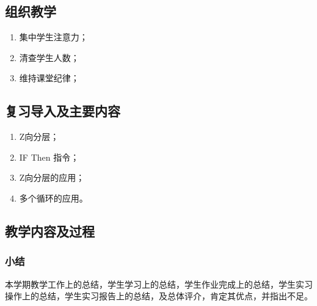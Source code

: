 \jxhj{%
	}

\makeshouye %

\subsection{组织教学}
\begin{enumerate}[\hspace{2em}1、]
	\item 集中学生注意力；
	\item 清查学生人数；
	\item 维持课堂纪律；
\end{enumerate}

\subsection{复习导入及主要内容}
\begin{enumerate}[1、]
\item Z向分层；
\item IF Then 指令；
\item Z向分层的应用；
\item 多个循环的应用。
\end{enumerate}

\subsection{教学内容及过程}
	
\subsubsection{小结}
	本学期教学工作上的总结，学生学习上的总结，学生作业完成上的总结，学生实习操作上的总结，学生实习报告上的总结，及总体评介，肯定其优点，并指出不足。


